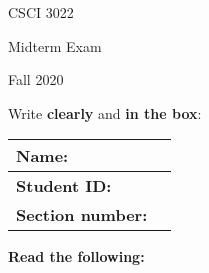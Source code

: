 \documentclass[addpoints]{exam}
\begin{document}
\begin{minipage}[ht!]{.25\textwidth}
CSCI 3022

Midterm Exam

Fall 2020
\vfill
\end{minipage}
\begin{minipage}[ht]{.75\textwidth}
	\large
	Write \textbf{clearly} and \textbf{in the box}:
	\centering
	\begin{tabular}{|l c|} 	\hline
	\rule{0pt}{1cm}
	\textbf{Name:} & \hspace{9cm} \\ \hline
	\rule{0pt}{1cm}
	\textbf{Student ID:} & \hspace{9cm} \\ \hline
	\rule{0pt}{1cm} \textbf{Section number:} & \hspace{9cm} \\ \hline
	\end{tabular}
\end{minipage}%

\vspace{1cm}

{\bf Read the following:}
\vspace{1pc}
\end{document}
